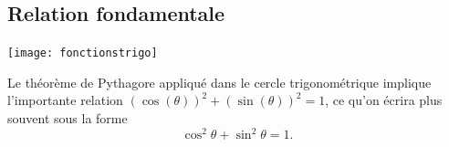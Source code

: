 \documentclass[french,xcolor=svgnames]{beamer}
\begin{document}
\subsection{Relation fondamentale}
\begin{frame}
  \begin{center}
    \texttt{[image: fonctionstrigo]}
  \end{center}
  \pause Le théorème de Pythagore\pause{} appliqué dans le cercle trigonométrique\pause{} implique l'importante relation $(\cos(\theta))^2 + (\sin(\theta))^2 = 1$,\pause{} ce qu'on écrira plus souvent sous la forme\pause{}
  \begin{equation*}
    \cos^2\theta + \sin^2 \theta  = 1.
  \end{equation*}
\end{frame}
\end{document}
